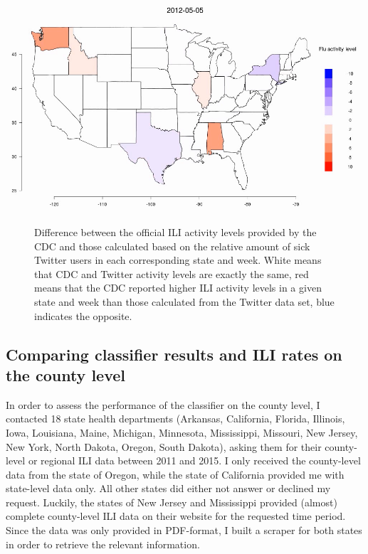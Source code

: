\documentclass[11pt, a4paper,twoside]{report}\usepackage[]{graphicx}\usepackage[]{color}
\begin{document}
\begin{center}
\href{run:vids/4_cdc_twitter_diff_user_state.avi}{\includegraphics[width=0.9\linewidth]{vids/4_cdc_twitter_diff_user_state.png}}
\end{center}
\begin{figure}[H]
\centering
  \caption{Difference between the official ILI activity levels provided by the CDC and those calculated based on the relative amount of sick Twitter users in each corresponding state and week. White means that CDC and Twitter activity levels are exactly the same, red means that the CDC reported higher ILI activity levels in a given state and week than those calculated from the Twitter data set, blue indicates the opposite.}
    \label{fig:cdc_twitter_comp_state}
\end{figure}

\subsection{Comparing classifier results and ILI rates on the county level}
\label{sec:comp_cdc_county}
In order to assess the performance of the classifier on the county level, I contacted 18 state health departments (Arkansas, California, Florida, Illinois, Iowa, Louisiana, Maine, Michigan, Minnesota, Mississippi, Missouri, New Jersey, New York, North Dakota, Oregon, South Dakota), asking them for their county-level or regional ILI data between 2011 and 2015. I only received the county-level data from the state of Oregon, while the state of California provided me with state-level data only. All other states did either not answer or declined my request. Luckily, the states of New Jersey and Mississippi provided (almost) complete county-level ILI data on their website for the requested time period. Since the data was only provided in PDF-format, I built a scraper for both states in order to retrieve the relevant information. 
\end{document}
